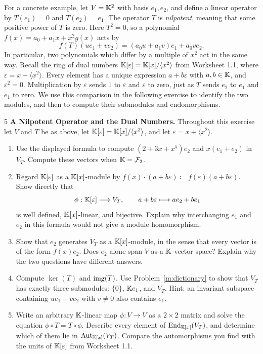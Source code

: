 \documentclass[Notebook.tex]{subfiles}
\begin{document}
\newpage

For a concrete example, let $V=\mathbb K^2$ with basis $e_1,e_2$, and define a linear operator by $T(e_1)=0$ and $T(e_2)=e_1$. The operator $T$ is \emph{nilpotent}, meaning that some positive power of $T$ is zero. Here $T^2=0$, so a polynomial $f(x)=a_0+a_1x+x^2g(x)$ acts by
\[
f(T)(ue_1+ve_2)=(a_0u+a_1v)e_1+a_0ve_2.
\]
In particular, two polynomials which differ by a multiple of $x^2$ act in the same way. Recall the ring of dual numbers $\mathbb K[\varepsilon]=\mathbb K[x]/\langle x^2\rangle$ from Worksheet 1.1, where $\varepsilon=x+\langle x^2\rangle$. Every element has a unique expression $a+b\varepsilon$ with $a,b\in\mathbb K$, and $\varepsilon^2=0$. Multiplication by $\varepsilon$ sends $1$ to $\varepsilon$ and $\varepsilon$ to zero, just as $T$ sends $e_2$ to $e_1$ and $e_1$ to zero. We use this comparison in the following exercise to identify the two modules, and then to compute their submodules and endomorphisms.

\hrulefill

\begin{problem}{5}\label{m:nilpotent}
	\textbf{A Nilpotent Operator and the Dual Numbers.} Throughout this exercise let $V$ and $T$ be as above, let $\mathbb K[\varepsilon]=\mathbb K[x]/\langle x^2\rangle$, and let $\varepsilon=x+\langle x^2\rangle$.
	\begin{enumerate}[label=(\alph*),ref=\theenumi\alph*]
		\item Use the displayed formula to compute $(2+3x+x^5)e_2$ and $x(e_1+e_2)$ in $V_T$. Compute these vectors when $\mathbb K=\mathcal{F}_2$.
		\item Regard $\mathbb K[\varepsilon]$ as a $\mathbb K[x]$-module by $f(x)\cdot(a+b\varepsilon)\coloneqq f(\varepsilon)(a+b\varepsilon)$. Show directly that
		\[
		\phi:\mathbb K[\varepsilon]\longrightarrow V_T,\qquad
		a+b\varepsilon\longmapsto ae_2+be_1
		\]
		is well defined, $\mathbb K[x]$-linear, and bijective. Explain why interchanging $e_1$ and $e_2$ in this formula would not give a module homomorphism.
		\item Show that $e_2$ generates $V_T$ as a $\mathbb K[x]$-module, in the sense that every vector is of the form $f(x)e_2$. Does $e_2$ alone span $V$ as a $\mathbb K$-vector space? Explain why the two questions have different answers.
		\item Compute $\ker(T)$ and $\operatorname{img}(T)$. Use Problem~\ref{m:dictionary} to show that $V_T$ has exactly three submodules: $\{0\}$, $\mathbb K e_1$, and $V_T$. Hint: an invariant subspace containing $ue_1+ve_2$ with $v\ne0$ also contains $e_1$.
		\item Write an arbitrary $\mathbb K$-linear map $\phi:V\to V$ as a $2\times2$ matrix and solve the equation $\phi\circ T=T\circ\phi$. Describe every element of $\operatorname{End}_{\mathbb K[x]}(V_T)$, and determine which of them lie in $\operatorname{Aut}_{\mathbb K[x]}(V_T)$. Compare the automorphisms you find with the units of $\mathbb K[\varepsilon]$ from Worksheet 1.1.
	\end{enumerate}
\end{problem}
\end{document}
